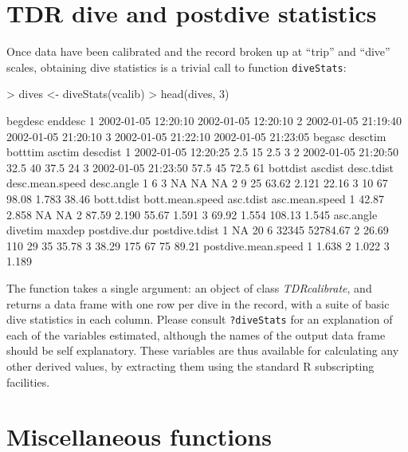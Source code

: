 \documentclass[12pt, letterpaper]{scrartcl}
\newcommand{\Rfunction}[1]{{\texttt{#1}}}
\newcommand{\Rclass}[1]{{\textit{#1}}}
\newcommand{\R}{{\normalfont\textsf{R }}{}}
\begin{document}
\section{TDR dive and postdive statistics}
\label{sec:tdr-stats}

Once data have been calibrated and the record broken up at ``trip'' and
``dive'' scales, obtaining dive statistics is a trivial call to function
\Rfunction{diveStats}:

\begin{Schunk}
\begin{Sinput}
> dives <- diveStats(vcalib)
> head(dives, 3)
\end{Sinput}
\begin{Soutput}
              begdesc             enddesc
1 2002-01-05 12:20:10 2002-01-05 12:20:10
2 2002-01-05 21:19:40 2002-01-05 21:20:10
3 2002-01-05 21:22:10 2002-01-05 21:23:05
               begasc desctim botttim asctim descdist
1 2002-01-05 12:20:25     2.5      15    2.5        3
2 2002-01-05 21:20:50    32.5      40   37.5       24
3 2002-01-05 21:23:50    57.5      45   72.5       61
  bottdist ascdist desc.tdist desc.mean.speed desc.angle
1        6       3         NA              NA         NA
2        9      25      63.62           2.121      22.16
3       10      67      98.08           1.783      38.46
  bott.tdist bott.mean.speed asc.tdist asc.mean.speed
1      42.87           2.858        NA             NA
2      87.59           2.190     55.67          1.591
3      69.92           1.554    108.13          1.545
  asc.angle divetim maxdep postdive.dur postdive.tdist
1        NA      20      6        32345       52784.67
2     26.69     110     29           35          35.78
3     38.29     175     67           75          89.21
  postdive.mean.speed
1               1.638
2               1.022
3               1.189
\end{Soutput}
\end{Schunk}

The function takes a single argument: an object of class
\Rclass{TDRcalibrate}, and returns a data frame with one row per dive in
the record, with a suite of basic dive statistics in each column.  Please
consult \verb|?diveStats| for an explanation of each of the variables
estimated, although the names of the output data frame should be self
explanatory.  These variables are thus available for calculating any other
derived values, by extracting them using the standard \R{} subscripting
facilities.


\section{Miscellaneous functions}
\label{sec:misc}
\end{document}
